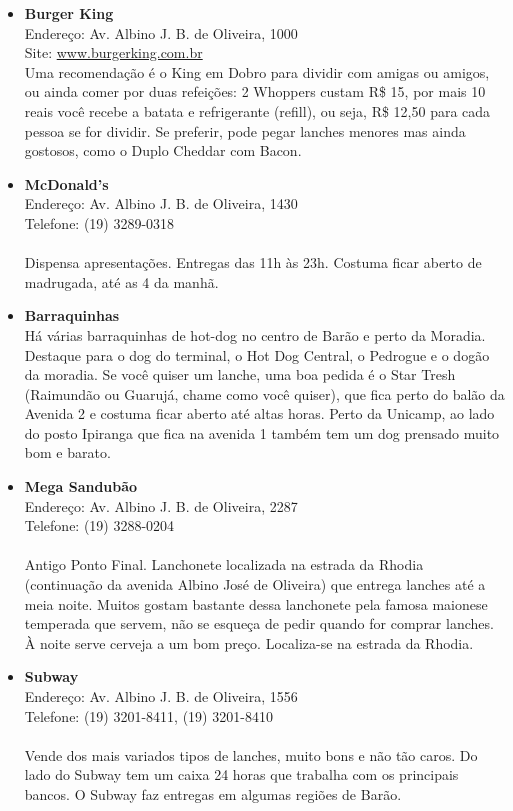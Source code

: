 \begin{itemize}
\item \textbf{Burger King}
  \\Endereço: Av. Albino J. B. de Oliveira, 1000
  \\Site: \url{www.burgerking.com.br}
  \\Uma recomendação é o King em Dobro para dividir com amigas ou amigos, ou
  ainda comer por duas refeições: 2 Whoppers custam R\$ 15, por mais 10 reais
  você recebe a batata e refrigerante (refill), ou seja, R\$ 12,50 para cada
  pessoa se for dividir. Se preferir, pode pegar lanches menores mas ainda
  gostosos, como o Duplo Cheddar com Bacon.

\item \textbf{McDonald's}
  \\Endereço: Av. Albino J. B. de Oliveira, 1430
  \\Telefone: (19) 3289-0318
  \\
  \\Dispensa apresentações. Entregas das 11h às 23h. Costuma ficar aberto
  de madrugada, até as 4 da manhã.

\item \textbf{Barraquinhas}
  \\Há várias barraquinhas de hot-dog no centro de Barão e perto da Moradia.
  Destaque para o dog do terminal, o Hot Dog Central, o Pedrogue e o dogão da
  moradia. Se você quiser um lanche, uma boa pedida é o Star Tresh (Raimundão
  ou Guarujá, chame como você quiser), que fica perto do balão da Avenida 2 e
  costuma ficar aberto até altas horas. Perto da Unicamp, ao lado do posto
  Ipiranga que fica na avenida 1 também tem um dog prensado muito bom e barato.

\item \textbf{Mega Sandubão}
  \\Endereço: Av. Albino J. B. de Oliveira, 2287
  \\Telefone: (19) 3288-0204
  \\
  \\Antigo Ponto Final. Lanchonete localizada na estrada da Rhodia
  (continuação da avenida Albino José de Oliveira) que entrega lanches até
  a meia noite. Muitos gostam bastante dessa lanchonete pela famosa maionese
  temperada que servem, não se esqueça de pedir quando for comprar lanches. À
  noite serve cerveja a um bom preço. Localiza-se na estrada da Rhodia.

\item \textbf{Subway}
  \\Endereço: Av. Albino J. B. de Oliveira, 1556
  \\Telefone: (19) 3201-8411, (19) 3201-8410
  \\
  \\Vende dos mais variados tipos de lanches, muito bons e não tão caros. Do
  lado do Subway tem um caixa 24 horas que trabalha com os principais bancos.
  O Subway faz entregas em algumas regiões de Barão.
\end{itemize}

